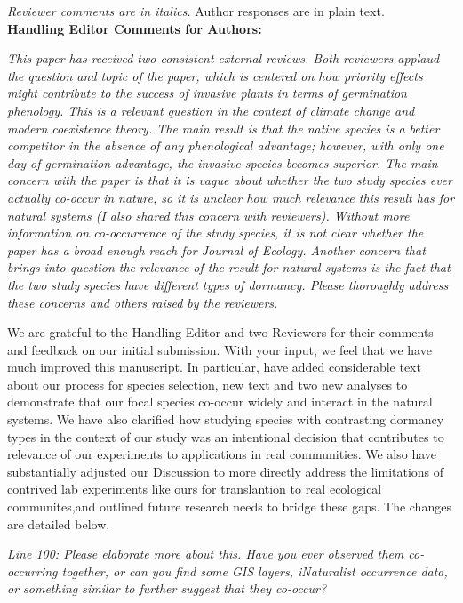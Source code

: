 \documentclass[11pt]{article}
\begin{document}
\emph{Reviewer comments are in italics.} Author responses are in plain text.\\

\textbf{Handling Editor Comments for Authors:}

\emph{This paper has received two consistent external reviews. Both reviewers applaud the question and topic of the paper, which is centered on how priority effects might contribute to the success of invasive plants in terms of germination phenology. This is a relevant question in the context of climate change and modern coexistence theory. The main result is that the native species is a better competitor in the absence of any phenological advantage; however, with only one day of germination advantage, the invasive species becomes superior. The main concern with the paper is that it is vague about whether the two study species ever actually co-occur in nature, so it is unclear how much relevance this result has for natural systems (I also shared this concern with reviewers). Without more information on co-occurrence of the study species, it is not clear whether the paper has a broad enough reach for Journal of Ecology. Another concern that brings into question the relevance of the result for natural systems is the fact that the two study species have different types of dormancy. Please thoroughly address these concerns and others raised by the reviewers. }

We are grateful to the Handling Editor and two Reviewers for their comments and feedback on our initial submission. With your input, we feel that we have much improved this manuscript. In particular, have added considerable text about our process for species selection, new text and two new analyses to demonstrate that our focal species co-occur widely and interact in the natural systems. We have also clarified how studying species with contrasting dormancy types in the context of our study was an intentional decision that contributes to relevance of our experiments to applications in real communities. We also have substantially adjusted our Discussion to more directly address the limitations of contrived lab experiments like ours for translantion to real ecological communites,and outlined future research needs to bridge these gaps. The changes are detailed below.

\emph{Line 100: Please elaborate more about this. Have you ever observed them co-occurring together, or can you find some GIS layers, iNaturalist occurrence data, or something similar to further suggest that they co-occur?} 
\end{document}
